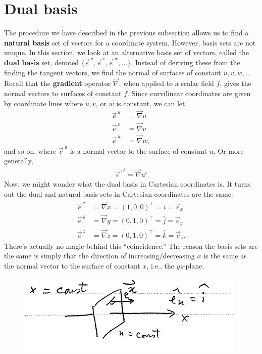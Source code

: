 \documentclass{book}
\theoremstyle{definition}
\begin{document}
\section{Dual basis}
The procedure we have described in the previous subsection allows us to find a \textbf{natural basis} set of vectors for a coordinate system. However, basis sets are not unique. In this section, we look at an alternative basis set of vectors, called the \textbf{dual basis} set, denoted $\{ \vec{e}^{\,u}, \vec{e}^{\,v}, \vec{e}^{\,w},\dots \}$. Instead of deriving these from the finding the tangent vectors, we find the normal of surfaces of constant $u,v,w,\dots$\\

Recall that the \textbf{gradient} operator $\vec{\nabla}$, when applied to a scalar field $f$, gives the normal vectors to surfaces of constant $f$. Since curvilinear coordinates are given by coordinate lines where $u,v$, or $w$ is constant, we can let
\begin{align*}
\vec{e}^{\,u} &= \vec{\nabla}u\\
\vec{e}^{\,v} &= \vec{\nabla}v\\
\vec{e}^{\,w} &= \vec{\nabla}w,
\end{align*}  
and so on, where $\vec{e}^{\,u}$ is a normal vector to the surface of constant $u$. Or more generally, 
\begin{align*}
\boxed{\vec{e}^{\,u^i} = \vec{\nabla}u^i}
\end{align*} 
Now, we might wonder what the dual basis in Cartesian coordinates is. It turns out the dual and natural basis sets in Cartesian coordinates are the same:
\begin{align*}
\vec{e}^{\,x} &= \vec{\nabla}x=(1,0,0)^\top=\hat{i} = \vec{e}_x \\
\vec{e}^{\,y} &= \vec{\nabla}y=(0,1,0)^\top=\hat{j} = \vec{e}_y \\
\vec{e}^{\,z} &= \vec{\nabla}z=(0,1,0)^\top=\hat{k} = \vec{e}_z.
\end{align*}
There's actually no magic behind this ``coincidence.'' The reason the basis sets are the same is simply that the direction of increasing/decreasing $x$ is the same as the normal vector to the surface of constant $x$, i.e., the $yz$-plane. 
\begin{figure}[!htb]
	\centering
	\includegraphics[scale=0.6]{xconst}
\end{figure}
\end{document}
